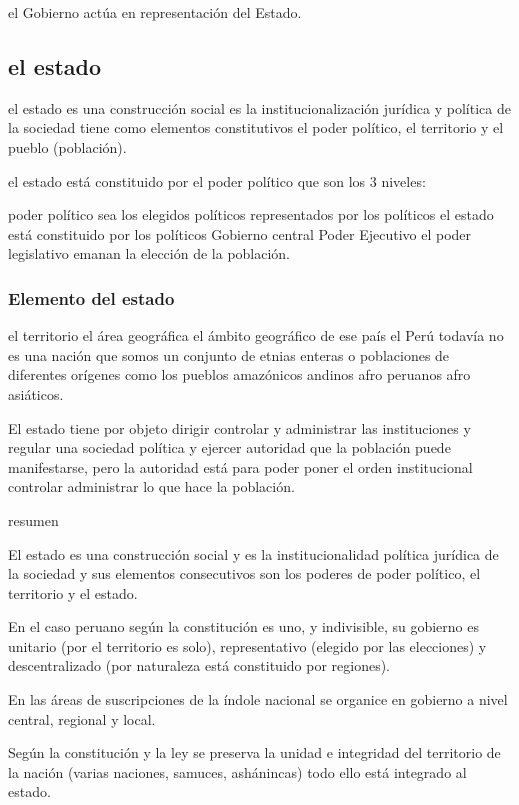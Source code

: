 \documentclass[
  a4paper,
]{article}
\begin{document}
el Gobierno actúa en representación del Estado.

\hypertarget{el-estado}{%
\subsection{el estado}\label{el-estado}}

el estado es una construcción social es la institucionalización jurídica
y política de la sociedad tiene como elementos constitutivos el poder
político, el territorio y el pueblo (población).

el estado está constituido por el poder político que son los 3 niveles:

poder político sea los elegidos políticos representados por los
políticos el estado está constituido por los políticos Gobierno central
Poder Ejecutivo el poder legislativo emanan la elección de la población.

\hypertarget{elemento-del-estado}{%
\subsubsection{Elemento del estado}\label{elemento-del-estado}}

el territorio el área geográfica el ámbito geográfico de ese país el
Perú todavía no es una nación que somos un conjunto de etnias enteras o
poblaciones de diferentes orígenes como los pueblos amazónicos andinos
afro peruanos afro asiáticos.

El estado tiene por objeto dirigir controlar y administrar las
instituciones y regular una sociedad política y ejercer autoridad que la
población puede manifestarse, pero la autoridad está para poder poner el
orden institucional controlar administrar lo que hace la población.

resumen

El estado es una construcción social y es la institucionalidad política
jurídica de la sociedad y sus elementos consecutivos son los poderes de
poder político, el territorio y el estado.

En el caso peruano según la constitución es uno, y indivisible, su
gobierno es unitario (por el territorio es solo), representativo
(elegido por las elecciones) y descentralizado (por naturaleza está
constituido por regiones).

En las áreas de suscripciones de la índole nacional se organice en
gobierno a nivel central, regional y local.

Según la constitución y la ley se preserva la unidad e integridad del
territorio de la nación (varias naciones, samuces, ashánincas) todo ello
está integrado al estado.
\end{document}
